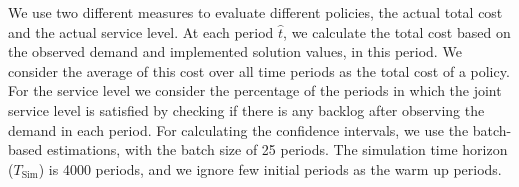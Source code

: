 \documentclass[10pt]{article}
\newcommand{\ti}{t} %
\newcommand{\Ti}{T}
\newcommand{\tAct}{\hat{\ti}} %
\begin{document}
We use two different measures to evaluate different policies, the actual total cost and the actual service level. At each period $\tAct$, we calculate the total cost based on the observed demand and implemented solution values, in this period. We consider the average of this cost over all time periods as the total cost of a policy. For the service level we consider the percentage of the periods in which the joint service level is satisfied by checking if there is any backlog after observing the demand in each period. For calculating the confidence intervals, we use the batch-based estimations, with the batch size of 25 periods. 
The simulation time horizon ($\Ti_\text{Sim}$) is 4000 periods, and we ignore few initial periods as the warm up periods.


\end{document}
